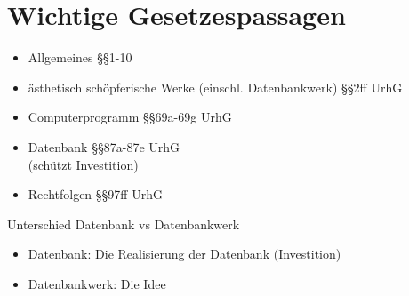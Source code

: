 \documentclass{scrreprt}
\begin{document}
\chapter{Wichtige Gesetzespassagen}
\begin{itemize}
\item Allgemeines \hfill §§1-10
\item ästhetisch schöpferische Werke (einschl. Datenbankwerk) \hfill §§2ff UrhG
\item Computerprogramm \hfill §§69a-69g UrhG
\item Datenbank \hfill §§87a-87e UrhG\\
(schützt Investition)
\item Rechtfolgen \hfill §§97ff UrhG
\end{itemize}

Unterschied Datenbank vs Datenbankwerk
\begin{itemize}
\item Datenbank: Die Realisierung der Datenbank (Investition)
\item Datenbankwerk: Die Idee
\end{itemize}
\end{document}
